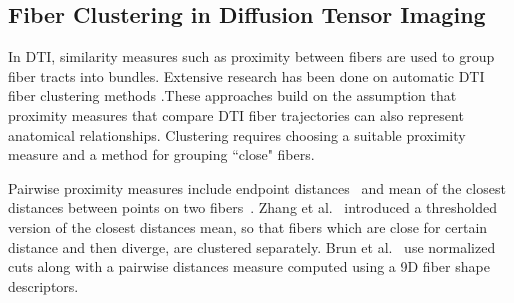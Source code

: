 \subsection {Fiber Clustering in Diffusion Tensor Imaging}
\label {subsec:fiberClus}
In DTI, similarity measures such as proximity between fibers are used to group fiber tracts into bundles. Extensive research has been done on automatic DTI fiber clustering methods \cite{Brun2004,Brun2003,Corouge2004,westinMEDIA02,Zhang2008}.These approaches build on the assumption that proximity measures that compare DTI fiber trajectories can also represent anatomical relationships.
Clustering requires choosing a suitable proximity measure and a method for grouping ``close" fibers.

Pairwise proximity measures include endpoint distances~\cite{Brun2003} and mean of the closest distances between points on two fibers~\cite{Corouge2004}. Zhang et al.~\cite{Zhang2008} introduced a thresholded version of the closest distances mean, so that fibers which are close for certain distance and then diverge, are clustered separately. Brun et al.~\cite{Brun2004} use normalized cuts along with a pairwise distances measure computed using a 9D fiber shape descriptors. 

